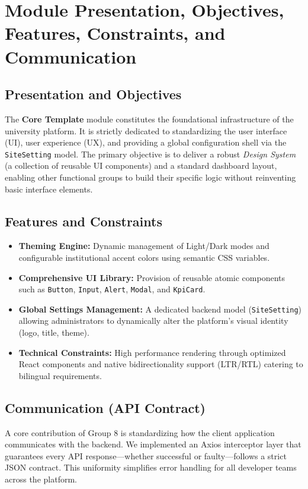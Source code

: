 \documentclass[12pt,a4paper]{report}
\begin{document}
\section{Module Presentation, Objectives, Features, Constraints, and Communication}

\subsection{Presentation and Objectives}
The \textbf{Core Template} module constitutes the foundational infrastructure of the university platform. It is strictly dedicated to standardizing the user interface (UI), user experience (UX), and providing a global configuration shell via the \texttt{SiteSetting} model. The primary objective is to deliver a robust \textit{Design System} (a collection of reusable UI components) and a standard dashboard layout, enabling other functional groups to build their specific logic without reinventing basic interface elements.

\subsection{Features and Constraints}
\begin{itemize}
    \item \textbf{Theming Engine:} Dynamic management of Light/Dark modes and configurable institutional accent colors using semantic CSS variables.
    \item \textbf{Comprehensive UI Library:} Provision of reusable atomic components such as \texttt{Button}, \texttt{Input}, \texttt{Alert}, \texttt{Modal}, and \texttt{KpiCard}.
    \item \textbf{Global Settings Management:} A dedicated backend model (\texttt{SiteSetting}) allowing administrators to dynamically alter the platform's visual identity (logo, title, theme).
    \item \textbf{Technical Constraints:} High performance rendering through optimized React components and native bidirectionality support (LTR/RTL) catering to bilingual requirements.
\end{itemize}

\subsection{Communication (API Contract)}
A core contribution of Group 8 is standardizing how the client application communicates with the backend. We implemented an Axios interceptor layer that guarantees every API response—whether successful or faulty—follows a strict JSON contract. This uniformity simplifies error handling for all developer teams across the platform.
\end{document}
